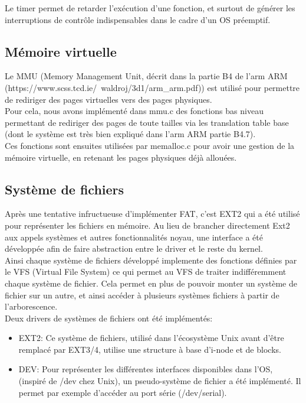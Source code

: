 \documentclass[a4paper]{article}
\begin{document}
Le timer permet de retarder l'exécution d'une fonction, et surtout de générer
les interruptions de contrôle indispensables dans le cadre d'un OS préemptif.

\subsection{Mémoire virtuelle}

Le MMU (Memory Management Unit, décrit dans la partie B4 de l'arm ARM
(https://www.scss.tcd.ie/~waldroj/3d1/arm\_arm.pdf)) est utilisé pour permettre
de rediriger des pages virtuelles vers des pages physiques.\\

Pour cela, nous avons implémenté dans mmu.c des fonctions bas niveau permettant de
rediriger des pages de toute tailles via les translation table base (dont le
système est très bien expliqué dans l'arm ARM partie B4.7).\\

Ces fonctions sont ensuites utilisées par memalloc.c pour avoir une gestion de
la mémoire virtuelle, en retenant les pages physiques déjà allouées.

\subsection{Système de fichiers}
Après une tentative infructueuse d'implémenter FAT, c'est EXT2 qui a été utilisé
pour représenter les fichiers en mémoire.
Au lieu de brancher directement Ext2 aux appels systèmes et autres fonctionnalités
noyau, une interface a été développée afin de faire abstraction entre le driver
et le reste du kernel. \\
Ainsi chaque système de fichiers développé implemente des fonctions définies
par le VFS (Virtual File System) ce qui permet au VFS de traiter indifféremment
chaque système de fichier. Cela permet en plus de pouvoir monter un système de
fichier sur un autre, et ainsi accéder à plusieurs systèmes fichiers à partir de
l'arborescence. \\
Deux drivers de systèmes de fichiers ont été implémentés:
\begin{itemize}
	\item EXT2: Ce système de fichiers, utilisé dans l'écosystème Unix avant
	d'être remplacé par EXT3/4, utilise une structure à base d'i-node et de blocks.
	\item DEV: Pour représenter les différentes interfaces disponibles dans l'OS,
	(inspiré de /dev chez Unix), un pseudo-système de fichier a été implémenté.
	Il permet par exemple d'accéder au port série (/dev/serial).
\end{itemize}
\end{document}
